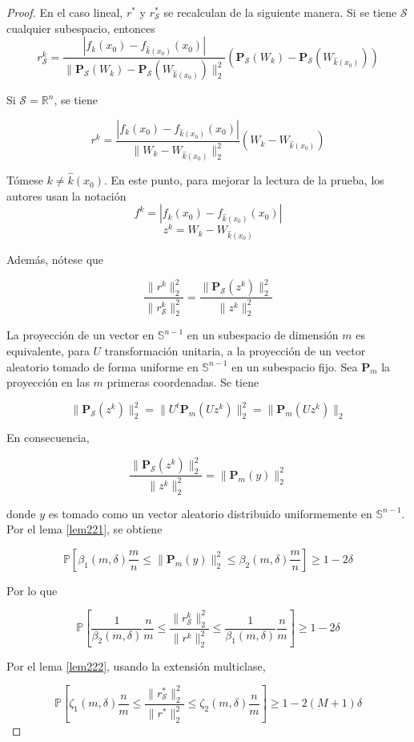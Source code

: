 \begin{proof}
En el caso lineal, $r^*$ y $r_\mathcal{S}^*$ se recalculan de la siguiente manera. Si se tiene $\mathcal{S}$ cualquier subespacio, entonces
$$r_{\mathcal{S}}^k = \frac{|f_k(x_0) - f_{\widehat{k}(x_0)}(x_0)|}{\|\textbf{P}_{\mathcal{S}} (W_k) - \textbf{P}_\mathcal{S} (W_{\widehat{k}(x_0)}) \|_2^2} (\textbf{P}_\mathcal{S} (W_k) - \textbf{P}_\mathcal{S} (W_{\widehat{k}(x_0)}))$$

Si $\mathcal{S}=\mathbb{R}^n$, se tiene

$$r^k = \frac{|f_k(x_0) - f_{\widehat{k}(x_0)}(x_0)|}{\|W_k - W_{\widehat{k}(x_0)} \|_2^2} (W_k - W_{\widehat{k}(x_0)})$$

Tómese $k \neq \widehat{k}(x_0)$. En este punto, para mejorar la lectura de la prueba, los autores usan la notación
$$f^k = |f_k(x_0) - f_{\widehat{k}(x_0)}(x_0)|$$
$$z^k = W_k - W_{\widehat{k}(x_0)}$$

Además, nótese que

$$\frac{\|r^k \|_2^2}{\|r_\mathcal{S}^k \|_2^2} = \frac{\|\textbf{P}_\mathcal{S} (z^k) \|_2^2}{\|z^k \|_2^2}$$

La proyección de un vector en $\mathbb{S}^{n-1}$ en un subespacio de dimensión $m$ es equivalente, para $U$ transformación unitaria, a la proyección de un vector aleatorio tomado de forma uniforme en $\mathbb{S}^{n-1}$ en un subespacio fijo. Sea $\textbf{P}_m$ la proyección en las $m$ primeras coordenadas. Se tiene

$$\|\textbf{P}_\mathcal{S} (z^k) \|_2^2 = \|U^{t} \textbf{P}_m (U z^k) \|_2^2 = \|\textbf{P}_m (U z^k) \|_2$$

En consecuencia,

$$\frac{\| \textbf{P}_\mathcal{S} (z^k) \|_2^2}{\|z^k \|_2^2} = \|\textbf{P}_m (y) \|_2^2$$

donde $y$ es tomado como un vector aleatorio distribuido uniformemente en $\mathbb{S}^{n-1}$. Por el lema \ref{lem221}, se obtiene

$$\mathbb{P} \left[ \beta_1 (m,\delta) \frac{m}{n} \leq \|\textbf{P}_m (y) \|_2^2 \leq \beta_2 (m,\delta) \frac{m}{n} \right] \geq 1 - 2\delta$$

Por lo que

$$\mathbb{P} \left[ \frac{1}{\beta_2 (m,\delta)} \frac{n}{m} \leq \frac{\|r_\mathcal{S}^k \|_2^2}{\|r^k \|_2^2} \leq \frac{1}{\beta_1 (m,\delta)} \frac{n}{m} \right] \geq 1-2\delta$$

Por el lema \ref{lem222}, usando la extensión multiclase, 

$$\mathbb{P} \left[ \zeta_1 (m,\delta) \frac{n}{m} \leq \frac{\|r_\mathcal{S}^*\|_2^2}{\|r^* \|_2^2} \leq \zeta_2 (m,\delta) \frac{n}{m} \right] \geq 1 - 2(M+1) \delta$$

\end{proof}

